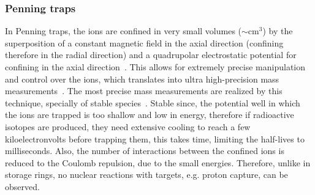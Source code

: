 \subsubsection{Penning traps}\label{subsubsec:intro:ptraps}
In Penning traps, the ions are confined in very small volumes ($\sim \mathrm{cm}^{3}$) by the superposition of a constant magnetic field in the axial direction (confining therefore in the radial direction) and a quadrupolar electrostatic potential for confining in the axial direction~\cite{Gabrielse}. This allows for extremely precise manipulation and control over the ions, which translates into ultra high-precision mass measurements~\cite{Sturm2014,Smorra2017}.
\newpar
The most precise mass measurements are realized by this technique, specially of stable species~\cite{heisseHighPrec}. Stable since, the potential well in which the ions are trapped is too shallow and low in energy, therefore if radioactive isotopes are produced, they need extensive cooling to reach a few kiloelectronvolts before trapping them, this takes time, limiting the half-lives to milliseconds. Also, the number of interactions between the confined ions is reduced to the Coulomb repulsion, due to the small energies. Therefore, unlike in storage rings, no nuclear reactions with targets, e.g. proton capture, can be observed.
